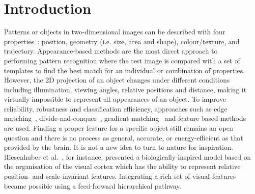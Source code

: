 \chapter{Introduction}
\label{cha:intro}
Patterns or objects in two-dimensional images can be described with four properties~\cite{wysoski2008fast}: position, geometry (i.e. size, area and shape), colour/texture, and trajectory. 
Appearance-based methods are the most direct approach to performing pattern recognition where the test image is compared with a set of templates to find the best match for an individual or combination of properties. 
However, the 2D projection of an object changes under different conditions including illumination, viewing angles, relative positions and distance, making it virtually impossible to represent all appearances of an object. 
To improve reliability, robustness and classification efficiency, approaches such as edge matching~\cite{canny1986computational}, divide-and-conquer~\cite{toygar2004multiple}, gradient matching~\cite{wei2006robust} and feature based methods~\cite{lowe2004distinctive, bay2008speeded} are used.
Finding a proper feature for a specific object still remains an open question and there is no process as general, accurate, or energy-efficient as that provided by the brain.
It is not a new idea to turn to nature for inspiration. 
Riesenhuber et al.~\cite{riesenhuber1999hierarchical}, for instance, presented a biologically-inspired model based on the organisation of the visual cortex which has the ability to represent relative position- and scale-invariant features.
Integrating a rich set of visual features became possible using a feed-forward hierarchical pathway. 

